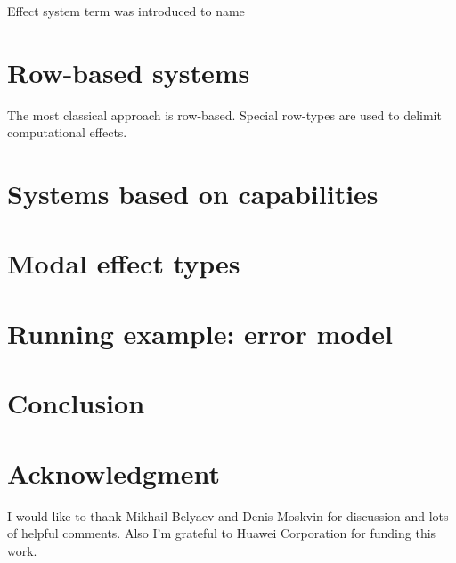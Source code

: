 \documentclass[conference]{IEEEtran}
\begin{document}
    Effect system term was introduced to name






    \section{Row-based systems}


    The most classical approach is row-based.
    Special row-types are used to delimit computational effects.




    \section{Systems based on capabilities}




    \section{Modal effect types}



    \section{Running example: error model}



    \section{Conclusion}



    \section*{Acknowledgment}

    I would like to thank Mikhail Belyaev and Denis Moskvin for discussion and lots of helpful comments.
    Also I'm grateful to Huawei Corporation for funding this work.
\end{document}
